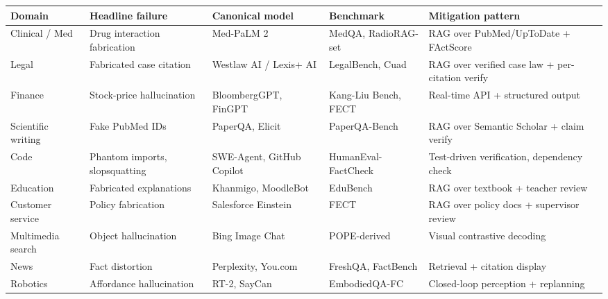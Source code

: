 {\def\LTcaptype{none} %
\begin{longtable}[]{@{}
  >{\raggedright\arraybackslash}p{}
  >{\raggedright\arraybackslash}p{}
  >{\raggedright\arraybackslash}p{}
  >{\raggedright\arraybackslash}p{}
  >{\raggedright\arraybackslash}p{}@{}}
\toprule\noalign{}
\begin{minipage}[b]{\linewidth}\raggedright
Domain
\end{minipage} & \begin{minipage}[b]{\linewidth}\raggedright
Headline failure
\end{minipage} & \begin{minipage}[b]{\linewidth}\raggedright
Canonical model
\end{minipage} & \begin{minipage}[b]{\linewidth}\raggedright
Benchmark
\end{minipage} & \begin{minipage}[b]{\linewidth}\raggedright
Mitigation pattern
\end{minipage} \\
\midrule\noalign{}
\endhead
\bottomrule\noalign{}
\endlastfoot
Clinical / Med & Drug interaction fabrication & Med-PaLM 2 & MedQA, RadioRAG-set & RAG over PubMed/UpToDate + FActScore \\
Legal & Fabricated case citation & Westlaw AI / Lexis+ AI & LegalBench, Cuad & RAG over verified case law + per-citation verify \\
Finance & Stock-price hallucination & BloombergGPT, FinGPT & Kang-Liu Bench, FECT & Real-time API + structured output \\
Scientific writing & Fake PubMed IDs & PaperQA, Elicit & PaperQA-Bench & RAG over Semantic Scholar + claim verify \\
Code & Phantom imports, slopsquatting & SWE-Agent, GitHub Copilot & HumanEval-FactCheck & Test-driven verification, dependency check \\
Education & Fabricated explanations & Khanmigo, MoodleBot & EduBench & RAG over textbook + teacher review \\
Customer service & Policy fabrication & Salesforce Einstein & FECT & RAG over policy docs + supervisor review \\
Multimedia search & Object hallucination & Bing Image Chat & POPE-derived & Visual contrastive decoding \\
News & Fact distortion & Perplexity, You.com & FreshQA, FactBench & Retrieval + citation display \\
Robotics & Affordance hallucination & RT-2, SayCan & EmbodiedQA-FC & Closed-loop perception + replanning \\
\end{longtable}
}

